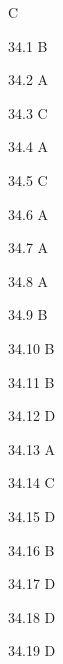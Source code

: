 \begin{Solution}{34}
C
\end{Solution}
\begin{Solution}{34.{1}}
B
\end{Solution}
\begin{Solution}{34.{2}}
A
\end{Solution}
\begin{Solution}{34.{3}}
C
\end{Solution}
\begin{Solution}{34.{4}}
A
\end{Solution}
\begin{Solution}{34.{5}}
C
\end{Solution}
\begin{Solution}{34.{6}}
A
\end{Solution}
\begin{Solution}{34.{7}}
A
\end{Solution}
\begin{Solution}{34.{8}}
A
\end{Solution}
\begin{Solution}{34.{9}}
B
\end{Solution}
\begin{Solution}{34.{10}}
B
\end{Solution}
\begin{Solution}{34.{11}}
B
\end{Solution}
\begin{Solution}{34.{12}}
D
\end{Solution}
\begin{Solution}{34.{13}}
A
\end{Solution}
\begin{Solution}{34.{14}}
C
\end{Solution}
\begin{Solution}{34.{15}}
D
\end{Solution}
\begin{Solution}{34.{16}}
B
\end{Solution}
\begin{Solution}{34.{17}}
D
\end{Solution}
\begin{Solution}{34.{18}}
D
\end{Solution}
\begin{Solution}{34.{19}}
D
\end{Solution}
